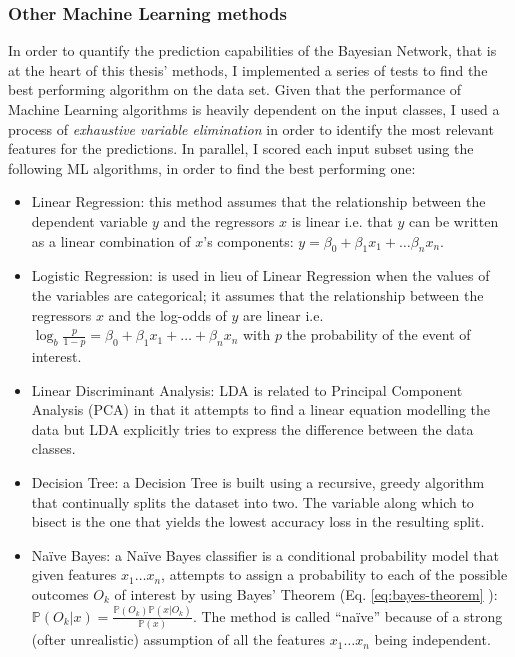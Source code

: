 \subsubsection{Other Machine Learning methods}
In order to quantify the prediction capabilities of the Bayesian Network, that is at the heart of this thesis' methods, I implemented a series of tests to find the best performing algorithm on the data set.
Given that the performance of Machine Learning algorithms is heavily dependent on the input classes, I used a process of \textit{exhaustive variable elimination} in order to identify the most relevant features for the predictions.
In parallel, I scored each input subset using the following ML algorithms, in order to find the best performing one:
\begin{itemize}
  \item Linear Regression: this method assumes that the relationship between the dependent variable $y$ and the regressors $x$ is linear i.e. that $y$ can be written as a linear combination of $x$'s components: $y = \beta_0 + \beta_1 x_1 + \ldots \beta_n x_n$.
  \item Logistic Regression: is used in lieu of Linear Regression when the values of the variables are categorical; it assumes that the relationship between the regressors $x$ and the log-odds of $y$ are linear i.e. $\log _{b} \frac{p}{1-p}=\beta_{0}+\beta_{1} x_{1}+ \ldots + \beta_{n} x_{n}$ with $p$ the probability of the event of interest.
  \item Linear Discriminant Analysis: LDA is related to Principal Component Analysis (PCA) in that it attempts to find a linear equation modelling the data but LDA explicitly tries to express the difference between the data classes.
  \item Decision Tree: a Decision Tree is built using a recursive, greedy algorithm that continually splits the dataset into two.  The variable along which to bisect is the one that yields the lowest accuracy loss in the resulting split.
  \item Na{\"i}ve Bayes: a Na{\"i}ve Bayes classifier is a conditional probability model that given features $x_1 \ldots x_n$, attempts to assign a probability to each of the possible outcomes $O_{k}$ of interest by using Bayes' Theorem (Eq. \ref{eq:bayes-theorem} ): $\mathbb{P}\left(O_{k} | x \right)=\frac{\mathbb{P}\left(O_{k}\right) \mathbb{P}\left(x| O_{k}\right)}{\mathbb{P}(x)}$.  The method is called \enquote{na{\"i}ve} because of a strong (ofter unrealistic) assumption of all the features $x_1 \ldots x_n$ being independent.

\end{itemize}
